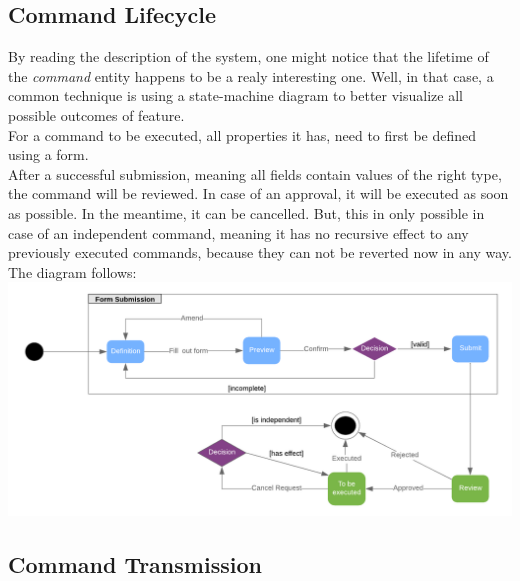 \documentclass{article}
\begin{document}
\newpage
\subsection{Command Lifecycle}
By reading the description of the system, one might notice that the lifetime of the \emph{command} entity happens to be a realy interesting one. Well, in that case, a common technique is using a state-machine diagram to better visualize all possible outcomes of feature.\\
For a command to be executed, all properties it has, need to first be defined using a form.\\
After a successful submission, meaning all fields contain values of the right type, the command will be reviewed. In case of an approval, it will be executed as soon as possible. In the meantime, it can be cancelled. But, this in only possible in case of an independent command, meaning it has no recursive effect to any previously executed commands, because they can not be reverted now in any way. The diagram follows:\\
\includegraphics[scale=0.325]{state}  

\hypertarget{CmdTrns}{\subsection{Command Transmission}}
\end{document}
